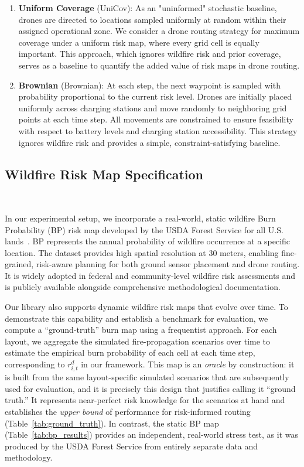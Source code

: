 \documentclass{article}
\begin{document}
\begin{enumerate}[leftmargin=1.1em, itemsep=0.3em, topsep=0.5em]
    \item \textbf{Uniform Coverage} (UniCov):
    As an "uninformed" stochastic baseline, drones are directed to locations sampled uniformly at random within their assigned operational zone. We consider a drone routing strategy for maximum coverage under a uniform risk map, where every grid cell is equally important. This approach, which ignores wildfire risk and prior coverage, serves as a baseline to quantify the added value of risk maps in drone routing.
    \item \textbf{Brownian} (Brownian): At each step, the next waypoint is sampled with probability proportional to the current risk level. Drones are initially placed uniformly across charging stations and move randomly to neighboring grid points at each time step. All movements are constrained to ensure feasibility with respect to battery levels and charging station accessibility. This strategy ignores wildfire risk and provides a simple, constraint-satisfying baseline.
\end{enumerate}

\subsection{Wildfire Risk Map Specification}~\label{sec:risk_maps}

In our experimental setup, we incorporate a real-world, static wildfire Burn Probability (BP) risk map developed by the USDA Forest Service for all U.S. lands~\citep{dillon2023whp}. BP represents the annual probability of wildfire occurrence at a specific location. The dataset provides high spatial resolution at 30 meters, enabling fine-grained, risk-aware planning for both ground sensor placement and drone routing. It is widely adopted in federal and community-level wildfire risk assessments and is publicly available alongside comprehensive methodological documentation.

Our library also supports dynamic wildfire risk maps that evolve over time. To demonstrate this capability and establish a benchmark for evaluation, we compute a ``ground-truth'' burn map using a frequentist approach. For each layout, we aggregate the simulated fire-propagation scenarios over time to estimate the empirical burn probability of each cell at each time step, corresponding to $r^d_{i,t}$ in our framework. This map is an \emph{oracle} by construction: it is built from the same layout-specific simulated scenarios that are subsequently used for evaluation, and it is precisely this design that justifies calling it ``ground truth.'' It represents near-perfect risk knowledge for the scenarios at hand and establishes the \emph{upper bound} of performance for risk-informed routing (Table~\ref{tab:ground_truth}). In contrast, the static BP map (Table~\ref{tab:bp_results}) provides an independent, real-world stress test, as it was produced by the USDA Forest Service from entirely separate data and methodology.
\end{document}
